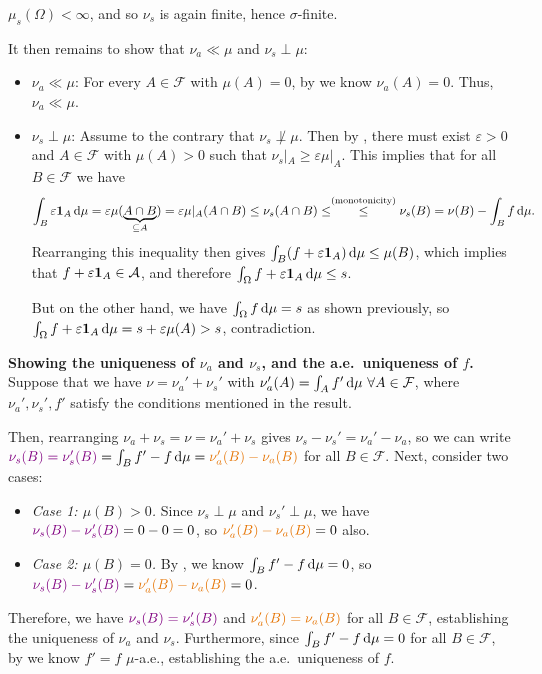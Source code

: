 \begin{enumerate}
\begin{pf}
\begin{itemize}
\(\mu_s(\Omega)<\infty\), and so \(\nu_s\) is again finite, hence \(\sigma\)-finite.
\end{itemize}
It then remains to show that \(\nu_a\ll\mu\) and \(\nu_s\perp\mu\):
\begin{itemize}
\item \underline{\(\nu_a\ll\mu\)}: For every \(A\in\mathcal{F}\) with \(\mu(A)=0\),
by  we know \(\nu_a(A)=0\). Thus, \(\nu_a\ll\mu\).
\item \underline{\(\nu_s\perp\mu\)}: Assume to the contrary that
\(\nu_s\not\perp\mu\). Then by , there must exist
\(\varepsilon>0\) and \(A\in\mathcal{F}\) with \(\mu(A)>0\) such that
\(\nu_s|_{A}\ge\varepsilon\mu|_{A}\). This implies that for all \(B\in\mathcal{F}\) we have
\[
\int_{B}^{}\varepsilon\indic_{A}\odif{\mu}=\varepsilon\mu(\underbrace{A\cap B}_{\subseteq A})
=\varepsilon\mu|_{A}(A\cap B)
\le\nu_s(A\cap B)\le\overset{\text{(monotonicity)}}{\le}\nu_s(B)=\nu(B)-\int_{B}^{}f\odif{\mu}.
\]
Rearranging this inequality then gives
\(\int_{B}^{}(f+\varepsilon\indic_{A})\odif{\mu}\le\mu(B)\), which implies that
\(f+\varepsilon\mathbf{1}_{A}\in\mathcal{A}\), and therefore
\(\int_{\Omega}^{}f+\varepsilon\indic_{A}\odif{\mu}\le s\).

But on the other hand, we have \(\int_{\Omega}^{}f\odif{\mu}=s\) as shown
previously, so
\(\int_{\Omega}^{}f+\varepsilon\indic_{A}\odif{\mu}=s+\varepsilon\mu(A)>s\),
contradiction.
\end{itemize}
\textbf{Showing the uniqueness of \(\nu_a\) and \(\nu_s\), and the a.e.\ uniqueness of \(f\).}
Suppose that we have \(\nu=\nu_a'+\nu_s'\) with \(\nu_a'(A)=\int_{A}^{}f'\odif{\mu
}~\forall A\in\mathcal{F}\), where \(\nu_a',\nu_s',f'\) satisfy the conditions
mentioned in the result.

Then, rearranging \(\nu_a+\nu_s=\nu=\nu_a'+\nu_s\) gives
\(\nu_s-\nu_s'=\nu_a'-\nu_a\), so we can write
\(\vc{\nu_s(B)=\nu_s'(B)}=\int_{B}^{}f'-f\odif{\mu}=\orc{\nu_a'(B)-\nu_a(B)}\)
for all \(B\in\mathcal{F}\). Next, consider two cases:
\begin{itemize}
\item \emph{Case 1: \(\mu(B)>0\).} Since \(\nu_s\perp\mu\) and
\(\nu_s'\perp\mu\), we have \(\vc{\nu_s(B)-\nu_s'(B)}=0-0=0\), so
\(\orc{\nu_a'(B)-\nu_a(B)}=0\) also.
\item \emph{Case 2: \(\mu(B)=0\).} By , we know
\(\int_{B}^{}f'-f\odif{\mu}=0\), so \(\vc{\nu_s(B)-\nu_s'(B)}=\orc{\nu_a'(B)-\nu_a(B)}=0\).
\end{itemize}
Therefore, we have \(\vc{\nu_s(B)=\nu_s'(B)}\) and \(\orc{\nu_a'(B)=\nu_a(B)}\)
for all \(B\in\mathcal{F}\), establishing the uniqueness of \(\nu_a\) and
\(\nu_s\).  Furthermore, since \(\int_{B}^{}f'-f\odif{\mu}=0\) for all
\(B\in\mathcal{F}\), by  we know \(f'=f\)
\(\mu\)-a.e., establishing the a.e.\ uniqueness of \(f\).


\end{pf}
\end{enumerate}
